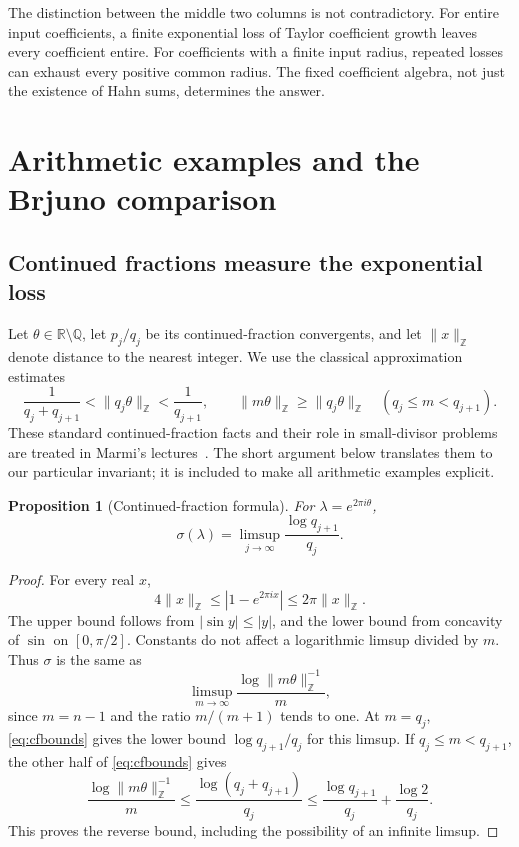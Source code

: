 \documentclass[11pt,a4paper]{article}
\numberwithin{equation}{section}
\newtheorem{proposition}[theorem]{Proposition}
\theoremstyle{definition}
\theoremstyle{remark}
\newcommand{\R}{\mathbb R}
\newcommand{\Q}{\mathbb Q}
\newcommand{\Z}{\mathbb Z}
\begin{document}
The distinction between the middle two columns is not contradictory.
For entire input coefficients, a finite exponential loss of Taylor
coefficient growth leaves every coefficient entire. For coefficients
with a finite input radius, repeated losses can exhaust every positive
common radius. The fixed coefficient algebra, not just the existence of
Hahn sums, determines the answer.

\section{Arithmetic examples and the Brjuno comparison}\label{sec:arithmetic}

\subsection{Continued fractions measure the exponential loss}

Let $\theta\in\R\setminus\Q$, let $p_j/q_j$ be its continued-fraction
convergents, and let $\|x\|_{\Z}$ denote distance to the nearest integer.
We use the classical approximation estimates
\begin{equation}\label{eq:cfbounds}
 \frac1{q_j+q_{j+1}}<\|q_j\theta\|_{\Z}<\frac1{q_{j+1}},
 \qquad
 \|m\theta\|_{\Z}\ge\|q_j\theta\|_{\Z}
       \quad(q_j\le m<q_{j+1}).
\end{equation}
These standard continued-fraction facts and their role in small-divisor
problems are treated in Marmi's lectures~\cite{Marmi}. The short argument
below translates them to our particular invariant; it is included to make
all arithmetic examples explicit.

\begin{proposition}[Continued-fraction formula]\label{prop:continued}
For $\lambda=e^{2\pi i\theta}$,
\[
 \sigma(\lambda)=\limsup_{j\to\infty}\frac{\log q_{j+1}}{q_j}.
\]
\end{proposition}

\begin{proof}
For every real $x$,
\[
 4\|x\|_{\Z}\le|1-e^{2\pi ix}|\le2\pi\|x\|_{\Z}.
\]
The upper bound follows from $|\sin y|\le|y|$, and the lower bound
from concavity of $\sin$ on $[0,\pi/2]$. Constants do not affect a
logarithmic limsup divided by $m$. Thus $\sigma$ is the same as
\[
 \limsup_{m\to\infty}\frac{\log\|m\theta\|_{\Z}^{-1}}m,
\]
since $m=n-1$ and the ratio $m/(m+1)$ tends to one. At $m=q_j$,
\eqref{eq:cfbounds} gives the lower bound
$\log q_{j+1}/q_j$ for this limsup. If $q_j\le m<q_{j+1}$, the other
half of \eqref{eq:cfbounds} gives
\[
 \frac{\log\|m\theta\|_{\Z}^{-1}}m
 \le\frac{\log(q_j+q_{j+1})}{q_j}
 \le\frac{\log q_{j+1}}{q_j}+\frac{\log2}{q_j}.
\]
This proves the reverse bound, including the possibility of an infinite
limsup.
\end{proof}
\end{document}

